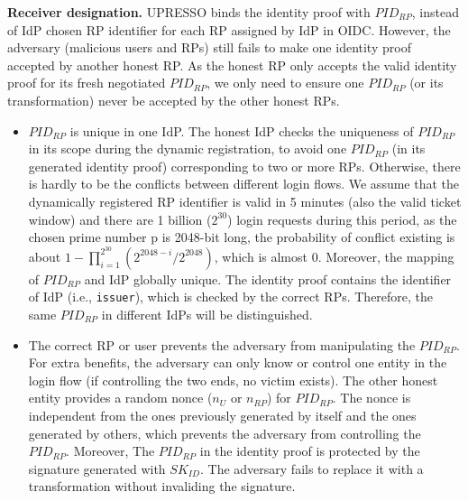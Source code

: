 \vspace{1mm}\noindent\textbf{Receiver designation.} UPRESSO binds the identity proof with $PID_{RP}$, instead of IdP chosen RP identifier for each RP assigned by IdP in OIDC. However, the adversary (malicious users and RPs) still fails to  make one identity proof 
accepted by another honest RP. As the honest RP only accepts the valid identity proof for its fresh negotiated $PID_{RP}$, we only need to ensure one $PID_{RP}$ (or its transformation) never be accepted by the other honest RPs.
\begin{itemize}
\item $PID_{RP}$ is unique in one IdP. The honest IdP checks the uniqueness of $PID_{RP}$ in its scope during the dynamic registration, to avoid one $PID_{RP}$ (in its generated identity proof) corresponding to two or more RPs. Otherwise, there is hardly to be the conflicts between different login flows. We assume that the dynamically registered RP identifier is valid in 5 minutes (also the valid ticket window) and there are 1 billion ($2^{30}$) login requests during this period, as the chosen prime number p is 2048-bit long, the probability of conflict existing is about $1-\prod_{i=1}^{2^{30}}(2^{2048-i}/2^{2048})$, which is almost 0. Moreover, the mapping of $PID_{RP}$ and IdP globally unique. The identity proof contains the identifier of IdP (i.e., \verb+issuer+), which is checked by the correct RPs. Therefore, the same $PID_{RP}$ in different IdPs will be distinguished.
\item The correct RP or user prevents the adversary from manipulating the $PID_{RP}$. For extra benefits, the adversary can only know or control one entity in the login flow (if controlling the two ends, no victim exists). The other honest entity provides a random nonce ($n_U$ or $n_{RP}$) for $PID_{RP}$. The nonce is independent from the ones previously generated by itself  and the ones generated by others, which prevents the adversary from controlling the $PID_{RP}$. Moreover, The $PID_{RP}$ in the identity proof is protected by the signature generated with $SK_{ID}$. The adversary fails to replace it with a transformation without invaliding the signature.

\end{itemize}

